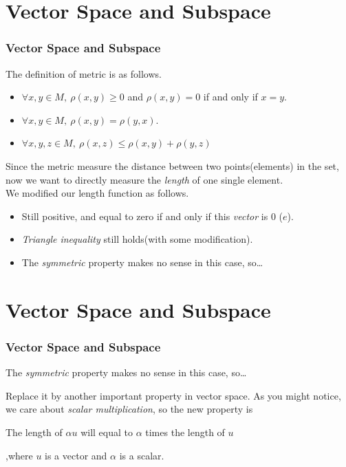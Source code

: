 \documentclass[12pt, t]{beamer}
\renewcommand{\emph}[1]{{\color{Turquoise3}\textsl{#1}}}
\begin{document}
\section{Vector Space and Subspace}
\begin{frame}
    \frametitle{Vector Space and Subspace}
    The definition of metric is as follows.
    \vspace{1em}
    \begin{itemize}
        \item $\forall x,y\in M,\ \rho (x,y) \geq 0$ and $\rho (x,y)=0$ if and only if $x=y$.
        \item  $\forall x,y\in M,\ \rho (x,y)=\rho (y,x)$.
        \item  $\forall x,y,z\in M,\ \rho (x,z)\leq \rho (x,y)+\rho (y,z)$
    \end{itemize}
    \hspace{1em}
    Since the metric measure the distance between two points(elements) in the set, now we want to directly measure the \emph{length} of one single element.\\
    \vspace{1em}
    \hspace{1em}
    We modified our length function as follows.
    \begin{itemize}
        \item Still positive, and equal to zero if and only if this \emph{vector} is 0 ($e$).
        \item \emph{Triangle inequality} still holds(with some modification).
        \item The \emph{symmetric} property makes no sense in this case, so\dots
    \end{itemize}

\end{frame}

\section{Vector Space and Subspace}
\begin{frame}
    \frametitle{Vector Space and Subspace}
    \begin{center}
        \center The \emph{symmetric} property makes no sense in this case, so\dots
    \end{center}
    \vspace{1em}

    Replace it by another important property in vector space. As you might notice, we care about \emph{scalar multiplication}, so the new property is
    \begin{center}
        \center The length of $\alpha u$ will equal to $\alpha$ times the length of $u$
    \end{center}
    \vspace{1em}

    ,where $u$ is a vector and $\alpha$ is a scalar.


\end{frame}
\end{document}
